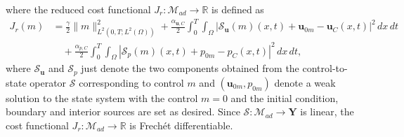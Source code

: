 \documentclass{amsart}
\newcommand{\LRp}[1]{\left( #1 \right)}
\begin{document}
where the reduced cost functional $J_r: \mathcal{M}_{ad} \rightarrow \mathbb{R}$ is defined as
\begin{align*}
	J_r(m) &=  \frac{\gamma}{2} \| m \|_{L^2(0,T; L^2(\Omega))}^2 + \frac{\alpha_{\boldsymbol{u}, C}}{2} \int_0^T \int_{\Omega} |\mathcal{S}_{\boldsymbol{u}}(m) \LRp{x, t} + \boldsymbol{u}_{0m} - \boldsymbol{u}_C \LRp{x, t}|^2 \, dx \, dt  \\
	&\quad + \frac{\alpha_{p, C}}{2} \int_0^T \int_{\Omega} |\mathcal{S}_p(m)\LRp{x, t} + p_{0m} - p_C (x, t)|^2 \, dx \, dt,
\end{align*}
where $\mathcal{S}_{\boldsymbol{u}}$ and $\mathcal{S}_{p}$ just denote the two components obtained from the control-to-state operator $\mathcal{S}$ corresponding to control $m$ and $(\boldsymbol{u}_{0m},p_{0m})$ denote a weak solution to the state system with the control $m=0$ and the initial condition, boundary and interior sources are set as desired. 
Since $\mathcal{S}:\mathcal{M}_{ad} \rightarrow \boldsymbol{Y}$ is linear, 
the cost functional $J_r:\mathcal{M}_{ad} \rightarrow \mathbb{R}$ is Frech\'et differentiable. 
\end{document}
